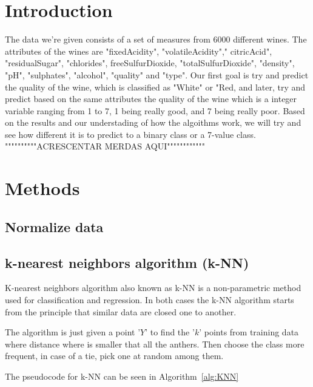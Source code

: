 \documentclass[twoside]{article}
\begin{document}
\begin{multicols}{2} %

\section{Introduction}
\indent \par
The data we're given consists of a set of measures from 6000 different wines. The attributes of the wines are "fixedAcidity", "volatileAcidity"," citricAcid", "residualSugar", "chlorides", freeSulfurDioxide, "totalSulfurDioxide", "density", "pH", "sulphates", "alcohol", "quality" and "type". Our first goal is try and predict the quality of the wine, which is classified as "White" or "Red, and later, try and predict based on the same attributes the quality of the wine which is a integer variable ranging from 1 to 7, 1 being really good, and 7 being really poor. Based on the results and our understading of how the algoithms work, we will try and see how different it is to predict to a binary class or a 7-value class.\\
 """"""""""ACRESCENTAR MERDAS AQUI""""""""""""



\section{Methods}
\subsection*{Normalize data}

\subsection*{k-nearest neighbors algorithm (k-NN)}
\indent \par
K-nearest neighbors algorithm also known as k-NN is a non-parametric method used for classification and regression. In both cases the k-NN algorithm starts from the principle that similar data are closed one to another.\par
The algorithm is just given a point '$Y$' to find the '$k$' points from training data where distance where is smaller that all the anthers. Then choose the class more frequent, in case of a tie, pick one at random among them.\par
The pseudocode for k-NN can be seen in Algorithm~\ref{alg:KNN} \cite{CA}


\end{multicols}
\end{document}
